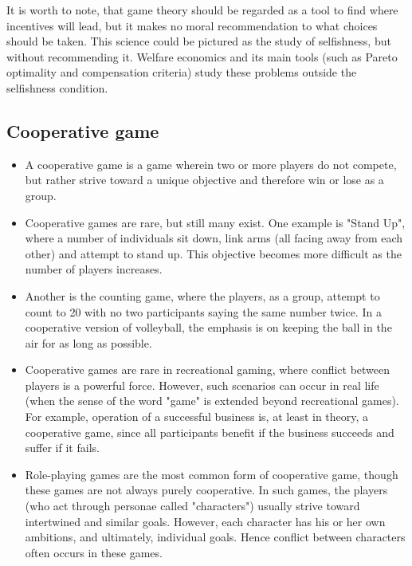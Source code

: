 \documentclass[]{report}
\begin{document}
It is worth to note, that game theory should be regarded as a tool to find where incentives will lead, but it makes no moral recommendation to what choices should be taken. This science could be pictured as the study of selfishness, but without recommending it.  Welfare economics and its main tools (such as Pareto optimality and compensation criteria) study these problems outside the selfishness condition.
\newpage
\subsection{Cooperative game}
\begin{itemize}
	\item A cooperative game is a game wherein two or more players do not compete, but rather strive toward a unique objective and therefore win or lose as a group.
	
	\item 	Cooperative games are rare, but still many exist. One example is "Stand Up", where a number of individuals sit down, link arms (all facing away from each other) and attempt to stand up. This objective becomes more difficult as the number of players increases.
	
	\item 	Another is the counting game, where the players, as a group, attempt to count to 20 with no two participants saying the same number twice. In a cooperative version of volleyball, the emphasis is on keeping the ball in the air for as long as possible.
	
	\item 	Cooperative games are rare in recreational gaming, where conflict between players is a powerful force. However, such scenarios can occur in real life (when the sense of the word "game" is extended beyond recreational games). For example, operation of a successful business is, at least in theory, a cooperative game, since all participants benefit if the business succeeds and suffer if it fails.
	
	\item 	Role-playing games are the most common form of cooperative game, though these games are not always purely cooperative. In such games, the players (who act through personae called "characters") usually strive toward intertwined and similar goals. However, each character has his or her own ambitions, and ultimately, individual goals. Hence conflict between characters often occurs in these games.
\end{itemize}
\end{document}
